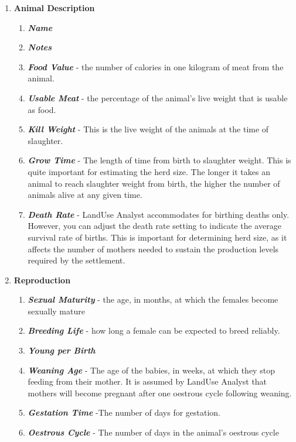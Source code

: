   \begin{enumerate}
    \item \textbf{Animal Description}
      \begin{enumerate}
        \item \textit{\textbf{Name}}
        \item  \textit{\textbf{Notes}}
        \item  \textit\textbf{{Food Value}} - the number
of calories in one kilogram of meat from the animal.
        \item  \textit{\textbf{Usable Meat}} - the percentage of the animal's live weight that is usable as food.
        \item  \textit{\textbf{Kill Weight}} - This is the live weight of the
animals at the time of slaughter.
        \item  \textit{\textbf{Grow Time}} - The length of time from birth to
slaughter weight.  This is quite important for estimating the herd size. The
longer it takes an animal to reach slaughter weight from birth, the higher the
number of animals alive at any given time.
        \item  \textit{\textbf{Death Rate}} - LandUse Analyst accommodates for
birthing deaths only. However, you can adjust the death
rate setting to indicate the average survival rate of births. This is important
for determining herd size, as it affects the number of mothers needed to sustain
the production levels required by the settlement. 
      \end{enumerate}

    \item \textbf{Reproduction}
      \begin{enumerate}
        \item  \textit{\textbf{Sexual Maturity}} - the age, in
months, at which the females become sexually mature
        \item  \textit\textbf{{Breeding Life}} - how long a female
can be expected to breed reliably.
        \item  \textit{\textbf{Young per Birth}}
        \item  \textit{\textbf{Weaning Age}} - The age of the babies, in weeks,
at which they stop feeding from their mother. It is assumed by LandUse Analyst
that mothers will become pregnant after one oestrous cycle following weaning. 
        \item  \textit{\textbf{Gestation Time}} -The number of days for
gestation. 
        \item  \textit{\textbf{Oestrous Cycle}} - The number of days in the
animal's oestrous cycle
      \end{enumerate}


\end{enumerate}
